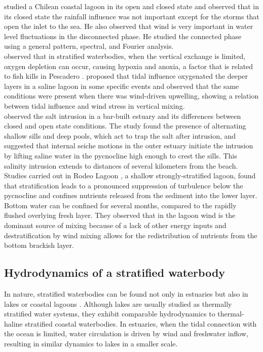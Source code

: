 \documentclass[tesis.tex]{subfiles}
\begin{document}
\cite{dussaillant2009} studied a Chilean coastal lagoon in its open and closed state and observed that in its closed state the rainfall influence was not important except for the storms that open the inlet to the sea. He also observed that wind is very important in water level fluctuations in the disconnected phase. He studied the connected phase using a general pattern, spectral, and Fourier analysis.\\

\cite{Gale2006} observed that in stratified waterbodies, when the vertical exchange is limited, oxygen depletion can occur, causing hypoxia and anoxia, a factor that is related to fish kills in Pescadero \citep{largier2015}. \cite{Kelly2018} proposed that tidal influence oxygenated the deeper layers in a saline lagoon in some specific events and observed that the same conditions were present when there was wind-driven upwelling, showing a relation between tidal influence and wind stress in vertical mixing.\\

\cite{Behrens2016} observed the salt intrusion in a bar-built estuary and its differences between closed and open state conditions. The study found the presence of alternating shallow sills and deep pools, which act to trap the salt after intrusion, and suggested that internal seiche motions in the outer estuary initiate the intrusion by lifting saline water in the pycnocline high enough to crest the sills. This salinity intrusion extends to distances of several kilometers from the beach.\\

Studies carried out in Rodeo Lagoon \citep{Cousins2010}, a shallow strongly-stratified lagoon, found that stratification leads to a pronounced suppression of turbulence below the pycnocline and confines nutrients released from the sediment into the lower layer. Bottom water can be confined for several months, compared to the rapidly flushed overlying fresh layer. They observed that in the lagoon wind is the dominant source of mixing because of a lack of other energy inputs and destratification by wind mixing allows for the redistribution of nutrients from the bottom brackish layer.\\

\subsection{Hydrodynamics of a stratified waterbody}

In nature, stratified waterbodies can be found not only in estuaries \citep{human2016} but also in lakes \citep{Valerio2012, Imam2013, Coman2012} or coastal lagoons \citep{Cousins2010}. Although lakes are usually studied as thermally stratified water systems, they exhibit comparable hydrodynamics to thermal-haline stratified coastal waterbodies. In estuaries, when the tidal connection with the ocean is limited, water circulation is driven by wind and freshwater inflow, resulting in similar dynamics to lakes in a smaller scale. \\
\end{document}
